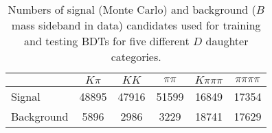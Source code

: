 \begin{table}[h]
  \centering
  \begin{tabular}{lccccc}
      \toprule
      & $K\pi$ & $KK$ & $\pi\pi$ & $K\pi\pi\pi$ & $\pi\pi\pi\pi$ \\
      \midrule
      Signal & 48895 & 47916 & 51599 & 16849 & 17354 \\
      Background & 5896 & 2986 & 3229 & 18741 & 17629 \\
      \bottomrule
  \end{tabular}
  \caption{\small Numbers of signal (Monte Carlo) and background ($B$ mass sideband in data) candidates used for training and testing BDTs for five different $D$ daughter categories.}
\label{tab:BDT_n_events}
\end{table}

